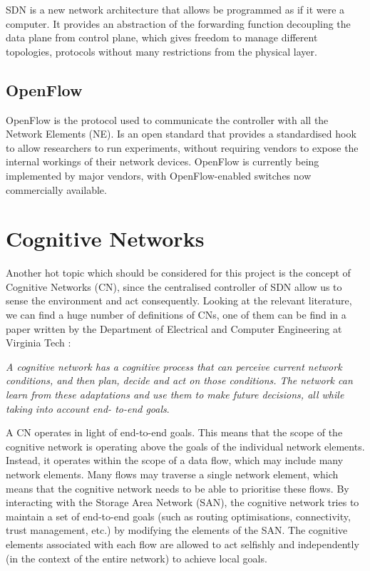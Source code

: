 SDN is a new network architecture that allows be programmed as if it were a computer. It provides an abstraction of the forwarding function decoupling the data plane from control plane, which gives freedom to manage different topologies, protocols without many restrictions from the physical layer.


\subsection{OpenFlow}
\label{sec:openflow}

OpenFlow is the protocol used to communicate the controller with all the Network Elements (NE). Is an open standard that provides a standardised hook to allow researchers to run experiments, without requiring vendors to expose the internal workings of their network devices. OpenFlow is currently being implemented by major vendors, with OpenFlow-enabled switches now commercially available.


\section{Cognitive Networks}

Another hot topic which should be considered for this project is the concept of Cognitive Networks (CN), since the centralised controller of SDN allow us to sense the environment and act consequently. Looking at the relevant literature, we can find a huge number of definitions of CNs, one of them can be find in a paper written by the Department of Electrical and Computer Engineering at Virginia Tech \cite{cognet-virginia}:

\emph{A cognitive network has a cognitive process that can perceive current network conditions, and then plan, decide and act on those conditions. The network can learn from these adaptations and use them to make future decisions, all while taking into account end- to-end goals}.


A CN operates in light of end-to-end goals. This means that the scope of the cognitive network is operating above the goals of the individual network elements. Instead, it operates within the scope of a data flow, which may include many network elements. Many flows may traverse a single network element, which means that the cognitive network needs to be able to prioritise these flows. By interacting with the Storage Area Network (SAN), the cognitive network tries to maintain a set of end-to-end goals (such as routing optimisations, connectivity, trust management, etc.) by modifying the elements of the SAN. The cognitive elements associated with each flow are allowed to act selfishly and independently (in the context of the entire network) to achieve local goals.

